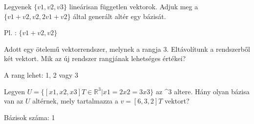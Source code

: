 \begin{frame}
  \begin{tcolorbox}[title={3/9. -N-}]
     Legyenek $\{v1,v2,v3\}$ lineárisan független vektorok. Adjuk meg a $\{v1 + v2,v2,2v1 + v2\}$ által generált altér egy bázisát.

  \tcblower

    \mmedskip 
  
     Pl. : $\{v1 + v2,v2\}$
  \end{tcolorbox}
\end{frame}


\begin{frame}
  \begin{tcolorbox}[title={3/10. -Q-}]
     Adott egy ötelemű vektorrendszer, melynek a rangja $3.$ Eltávolítunk a rendszerből két vektort. Mik az új rendszer rangjának lehetséges értékei?
  \tcblower

    \mmedskip 
  
     A rang lehet: 1, 2 vagy 3

  \end{tcolorbox}
\end{frame}


\begin{frame}
  \begin{tcolorbox}[title={3/11. -Q-}]
     Legyen $U = \{[x1,x2,x3]T \in \mathbb{R}^3|x1 = 2x2 = 3x3\}$ az ^3 altere. Hány olyan bázisa van az $U$ altérnek, mely tartalmazza a $v = [6,3,2]T$ vektort?
  \tcblower

    \mmedskip 
    Bázisok száma: 1
  \end{tcolorbox}
\end{frame}



